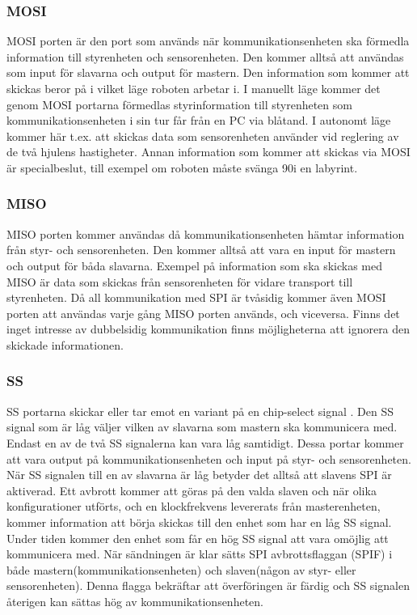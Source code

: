 \subsubsection{MOSI}
MOSI porten är den port som används när kommunikationsenheten ska förmedla
information till styrenheten och sensorenheten. Den kommer alltså att användas som
input för slavarna och output för mastern. Den information som kommer att
skickas beror på i vilket läge roboten arbetar i. I manuellt läge kommer det
genom MOSI portarna förmedlas styrinformation till styrenheten som
kommunikationsenheten i sin tur får från en PC via blåtand. I autonomt läge
kommer här t.ex. att skickas data som sensorenheten använder vid
reglering av de två hjulens hastigheter. Annan information som kommer att skickas via MOSI är
specialbeslut, till exempel om roboten måste svänga 90\degree i en labyrint.

\subsubsection{MISO}
MISO porten kommer användas då kommunikationsenheten hämtar information från styr- och sensorenheten. Den kommer alltså att vara en input för mastern och output för båda slavarna. Exempel på information som ska skickas med MISO är data som skickas från sensorenheten för vidare transport till styrenheten.
Då all kommunikation med SPI är tvåsidig kommer även MOSI porten att användas varje gång MISO porten används, och viceversa. Finns det inget intresse av dubbelsidig kommunikation finns möjligheterna att ignorera den skickade informationen.

\subsubsection{SS}
SS portarna skickar eller tar emot en variant på en chip-select signal . Den SS signal som är låg väljer vilken av slavarna som mastern ska kommunicera med. Endast en av de två SS signalerna kan vara låg samtidigt. Dessa portar kommer att vara output på kommunikationsenheten och input på styr- och sensorenheten.
När SS signalen till en av slavarna är låg betyder det alltså att slavens SPI är aktiverad. Ett avbrott kommer att göras på den valda slaven och när olika konfigurationer utförts, och en klockfrekvens levererats från masterenheten, kommer information att börja skickas till den enhet som har en låg SS signal. Under tiden kommer den enhet som får en hög SS signal att vara omöjlig att kommunicera med.
När sändningen är klar sätts SPI avbrottsflaggan (SPIF) i både mastern(kommunikationsenheten) och slaven(någon av styr- eller sensorenheten). Denna flagga bekräftar att överföringen är färdig och SS signalen återigen kan sättas hög av kommunikationsenheten.


